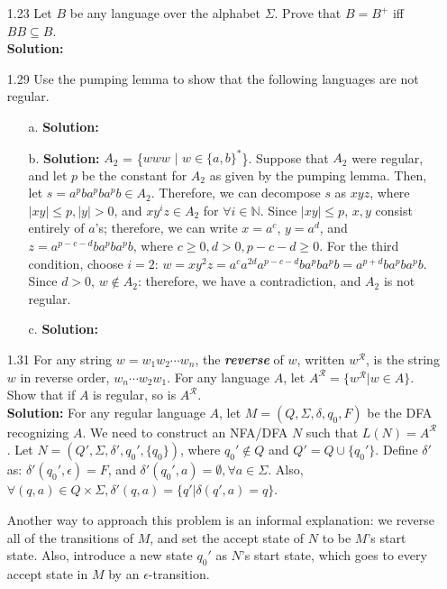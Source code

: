 \begin{enumerate}
\item[1.23]Let $B$ be any language over the alphabet $\Sigma$. Prove that $B = B^+$ iff $BB \subseteq B$.
\\
\textbf{Solution:} \alreadyanswered

\item[1.29]Use the pumping lemma to show that the following languages are not regular.
\begin{enumerate}
\item[a.]\textbf{Solution:} \alreadyanswered
\item[b.]\textbf{Solution:} $A_2$ = \{$www$ $|$ $w \in \{a, b\}^*$\}. Suppose that $A_2$ were regular, and let $p$ be the constant for $A_2$ as given by the pumping lemma. Then, let $s = a^{p}ba^{p}ba^{p}b \in A_2$. Therefore, we can decompose $s$ as $xyz$, where $|xy| \le p, |y| > 0$, and $xy^iz \in A_2$ for $\forall i \in \mathbb{N}$. Since $|xy| \le p$, $x, y$ consist entirely of $a$'s; therefore, we can write $x = a^c$, $y = a^d$, and $z = a^{p-c-d}ba^{p}ba^{p}b$, where $c \ge 0, d > 0, p-c-d \ge 0$. For the third condition, choose $i = 2$: $w = xy^{2}z = a^{c}a^{2d}a^{p-c-d}ba^{p}ba^{p}b = a^{p+d}ba^{p}ba^{p}b$. Since $d > 0$, $w \notin A_2$: therefore, we have a contradiction, and $A_2$ is not regular.
\item[c.]\textbf{Solution:} \alreadyanswered
\end{enumerate}

\item[1.31]For any string $w = w_{1}w_{2}\cdots w_{n}$, the \textbf{\emph{reverse}} of $w$, written $w^{\mathcal{R}}$, is the string $w$ in reverse order, $w_n\cdots w_{2}w_{1}$. For any language $A$, let $A^{\mathcal{R}} = \{w^{\mathcal{R}} | w \in A\}$. Show that if $A$ is regular, so is $A^{\mathcal{R}}$. 
\\
\textbf{Solution:} For any regular language $A$, let $M = (Q, \Sigma, \delta, q_0, F)$ be the DFA recognizing $A$. We need to construct an NFA/DFA $N$ such that $L(N) = A^{\mathcal{R}}$. Let $N = (Q', \Sigma, \delta', q_0', \{q_0\})$, where $q_0' \notin Q$ and $Q' = Q \cup \{q_0'\}$. Define $\delta'$ as: $\delta'(q_0', \epsilon) = F$, and $\delta'(q_0', a) = \emptyset, \forall a \in \Sigma$. Also, $\forall (q, a) \in Q \times \Sigma, \delta'(q, a) = \{q' | \delta(q', a) = q\}$. 

\par Another way to approach this problem is an informal explanation: we reverse all of the transitions of $M$, and set the accept state of $N$ to be $M$'s start state. Also, introduce a new state $q_0'$ as $N$'s start state, which goes to every accept state in $M$ by an $\epsilon$-transition.


\end{enumerate}
